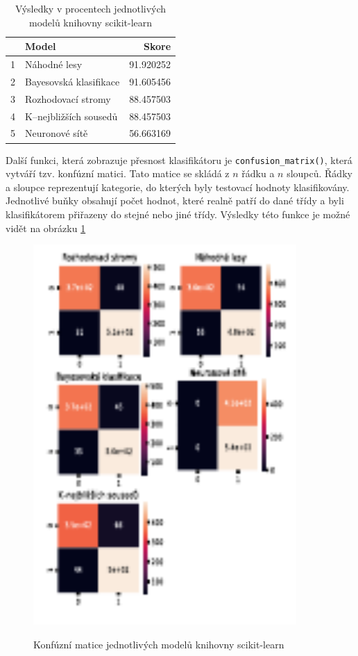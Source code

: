 \begin{table}[]
    \centering
    \begin{tabular}{llr}
\toprule
{} &                    Model &      Skore \\
\midrule
1 &             Náhodné lesy &  91.920252 \\
2 &  Bayesovská klasifikace &  91.605456 \\
3 &       Rozhodovací stromy &  88.457503 \\
4 &    K–nejbližších sousedů &  88.457503 \\
5 &           Neuronové sítě &  56.663169 \\
\bottomrule
\end{tabular}
    \caption{Výsledky v procentech jednotlivých modelů knihovny scikit-learn}
    \label{tab4}
\end{table}

Další funkci, která zobrazuje přesnost klasifikátoru je \verb|confusion_matrix()|, která vytváří tzv. konfúzní matici. Tato matice se skládá z $n$ řádku a $n$ sloupců. Řádky a sloupce reprezentují kategorie, do kterých byly testovací hodnoty klasifikovány. Jednotlivé buňky obsahují počet hodnot, které realně patří do dané třídy a byli klasifikátorem přiřazeny do stejné nebo jiné třídy. Výsledky této funkce je možné vidět na obrázku \ref{konfuznimatice}

\begin{figure}[h]\centering
  \centering
  \includegraphics[width=\textwidth,height=5.7in]{obrazky/modely.pdf}\\[1pt]
  \caption{Konfúzní matice jednotlivých modelů knihovny scikit-learn}
  \label{konfuznimatice}
\end{figure}

